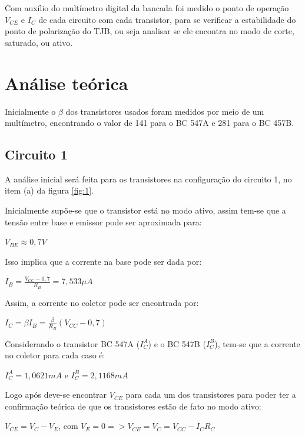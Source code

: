 Com auxílio do multímetro digital da bancada foi medido o ponto de operação $V_{CE}$ e $I_C$ de cada circuito com cada transistor, para se verificar a estabilidade do ponto de polarização do TJB, ou seja analisar se ele encontra no modo de corte, saturado, ou ativo.


\section{Análise teórica}
Inicialmente o $\beta$ dos transistores usados foram medidos por meio de um multímetro, encontrando o valor de 141 para o BC 547A e 281 para o BC 457B.

\subsection{Circuito 1}

A análise inicial será feita para os transistores na configuração do circuito 1, no item (a) da figura \ref{fig:1}. 

Inicialmente supõe-se que o transistor está no modo ativo, assim tem-se que a tensão entre base e emissor pode ser aproximada para:

\begin{center}
    $V_{BE} \approx 0,7 V$
\end{center}

Isso implica que a corrente na base pode ser dada por:

\begin{center}
    $ I_B = \frac{V_{CC}-0,7}{R_B} = 7,533 \mu A$
\end{center}

Assim, a corrente no coletor pode ser encontrada por:

\begin{center}
    $I_C = \beta I_B = \frac{\beta}{R_B} (V_{CC}-0,7)$
\end{center}

Considerando o transistor BC 547A ($I_{C}^{A}$) e o BC 547B ($I_{C}^{B}$), tem-se que a corrente no coletor para cada caso é:

\begin{center}
    $I_{C}^{A} = 1,0621 mA$ e $I_{C}^{B} = 2,1168 mA$
\end{center}

Logo após deve-se encontrar $V_{CE}$ para cada um dos transistores para poder ter a confirmação teórica de que os transistores estão de fato no modo ativo:
 
\begin{center}
    $V_{CE} = V_C - V_E $, com $V_E = 0 => V_{CE} = V_C = V_{CC} - I_C R_C$
\end{center}

